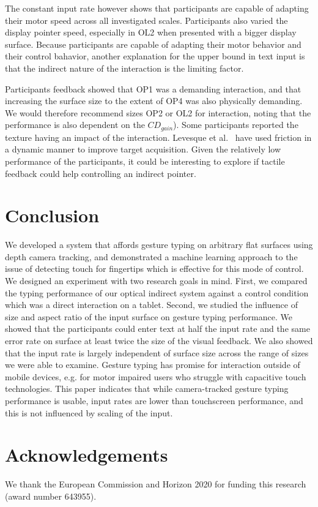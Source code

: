 \documentclass{chi-ext}
\newcommand{\cdt}[1]{{\small\uppercase{{#1}}}}
\begin{document}
The constant input rate however shows that participants are capable of adapting their motor speed across all investigated scales. Participants also varied the display pointer speed, especially in \cdt{OL2} when presented with a bigger display surface. Because participants are capable of adapting their motor behavior and their control bahavior, another explanation for the upper bound in text input is that the indirect nature of the interaction is the limiting factor.

Participants feedback showed that \cdt{OP1} was a demanding interaction, and that increasing the surface size to the extent of \cdt{OP4} was also physically demanding. We would therefore recommend sizes \cdt{OP2} or \cdt{OL2} for interaction, noting that the performance is also dependent on the $CD_{gain}$). Some participants reported the texture having an impact of the interaction. Levesque et al.~\cite{Levesque2011} have used friction in a dynamic manner to improve target acquisition. Given the relatively low performance of the participants, it could be interesting to explore if tactile feedback could help controlling an indirect pointer.

\section{Conclusion}
We developed a system that affords gesture typing on arbitrary flat surfaces using depth camera tracking, and demonstrated a machine learning approach to the issue of detecting touch for fingertips which is effective for this mode of control. We designed an experiment with two research goals in mind. First, we compared the typing performance of our optical indirect system against a control condition which was a direct interaction on a tablet. Second, we studied the influence of size and aspect ratio of the input surface on gesture typing performance. We showed that the participants could enter text at half the input rate and the same error rate on surface at least twice the size of the visual feedback. We also showed that the input rate is largely independent of surface size across the range of sizes we were able to examine. Gesture typing has promise for interaction outside of mobile devices, e.g. for motor impaired users who struggle with capacitive touch technologies. This paper indicates that while camera-tracked gesture typing performance is usable, input rates are lower than touchscreen performance, and this is not influenced by scaling of the input.

\section{Acknowledgements}
We thank the European Commission and Horizon 2020 for funding this research (award number 643955).

\newpage

\balance


\end{document}
